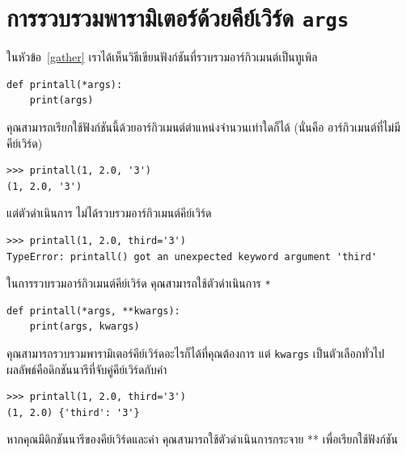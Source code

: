 \section{การรวบรวมพารามิเตอร์ด้วยคีย์เวิร์ด \texttt{args}} %


ในหัวข้อ~\ref{gather} เราได้เห็นวิธีเขียนฟังก์ชันที่รวบรวมอาร์กิวเมนต์เป็นทูเพิล

\begin{verbatim}
def printall(*args):
    print(args)
\end{verbatim}
%
คุณสามารถเรียกใช้ฟังก์ชันนี้ด้วยอาร์กิวเมนต์ตำแหน่งจำนวนเท่าใดก็ได้ (นั่นคือ อาร์กิวเมนต์ที่ไม่มีคีย์เวิร์ด)

\begin{verbatim}
>>> printall(1, 2.0, '3')
(1, 2.0, '3')
\end{verbatim}
%
แต่ตัวดำเนินการ {\tt *} ไม่ได้รวบรวมอาร์กิวเมนต์คีย์เวิร์ด

\begin{verbatim}
>>> printall(1, 2.0, third='3')
TypeError: printall() got an unexpected keyword argument 'third'
\end{verbatim}
%
ในการรวบรวมอาร์กิวเมนต์คีย์เวิร์ด คุณสามารถใช้ตัวดำเนินการ {\tt **}

\begin{verbatim}
def printall(*args, **kwargs):
    print(args, kwargs)
\end{verbatim}
%
คุณสามารถรวบรวมพารามิเตอร์คีย์เวิร์ดอะไรก็ได้ที่คุณต้องการ แต่ {\tt kwargs} เป็นตัวเลือกทั่วไป ผลลัพธ์คือดิกชันนารีที่จับคู่คีย์เวิร์ดกับค่า

\begin{verbatim}
>>> printall(1, 2.0, third='3')
(1, 2.0) {'third': '3'}
\end{verbatim}
%
หากคุณมีดิกชันนารีของคีย์เวิร์ดและค่า คุณสามารถใช้ตัวดำเนินการกระจาย ** เพื่อเรียกใช้ฟังก์ชัน

